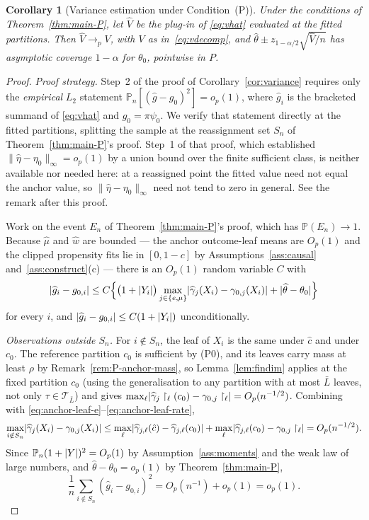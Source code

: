\documentclass[11pt]{article}
\theoremstyle{plain}
\newtheorem{corollary}[theorem]{Corollary}
\theoremstyle{definition}
\theoremstyle{remark}
\newcommand{\PP}{\mathbb{P}}
\newcommand{\Pn}{\mathbb{P}_n}
\newcommand{\cT}{\mathcal{T}}
\newcommand{\mhat}{\widehat{\mu}}
\newcommand{\what}{\widehat{w}}
\newcommand{\thetahat}{\widehat{\theta}}
\newcommand{\Vhat}{\widehat{V}}
\newcommand{\Linf}[1]{\lVert #1 \rVert_{\infty}}
\DeclarePairedDelimiter{\abs}{\lvert}{\rvert}
\begin{document}
\begin{corollary}[Variance estimation under Condition~(P)]
\label{cor:variance-P}
Under the conditions of Theorem~\ref{thm:main-P}, let $\Vhat$ be the plug-in
of \eqref{eq:vhat} evaluated at the fitted partitions. Then $\Vhat\to_pV$,
with $V$ as in~\eqref{eq:vdecomp}, and
$\thetahat\pm z_{1-\alpha/2}\sqrt{\Vhat/n}$ has asymptotic coverage
$1-\alpha$ for $\theta_0$, pointwise in $P$.
\end{corollary}

\begin{proof}
\emph{Proof strategy.} Step~2 of the proof of Corollary~\ref{cor:variance}
requires only the \emph{empirical} $L_2$ statement
$\Pn[(\widehat g-g_0)^2]=o_p(1)$, where $\widehat g_i$ is the bracketed
summand of \eqref{eq:vhat} and $g_0=\pi\psi_0$. We verify that statement
directly at the fitted partitions, splitting the sample at the reassignment
set $S_n$ of Theorem~\ref{thm:main-P}'s proof. Step~1 of that proof, which
established $\Linf{\widehat\eta-\eta_0}=o_p(1)$ by a union bound over the
finite sufficient class, is neither available nor needed here: at a
reassigned point the fitted value need not equal the anchor value, so
$\Linf{\widehat\eta-\eta_0}$ need not tend to zero in general. See the remark
after this proof.

Work on the event $E_n$ of Theorem~\ref{thm:main-P}'s proof, which has
$\PP(E_n)\to1$. Because $\mhat$ and $\what$ are bounded --- the anchor
outcome-leaf means are $O_p(1)$ and the clipped propensity fits lie in
$[0,1-c]$ by Assumptions~\ref{ass:causal} and~\ref{ass:construct}(c) --- there
is an $O_p(1)$ random variable $C$ with
\[
  \abs{\widehat g_i-g_{0,i}}
  \le
  C\Bigl\{
    \bigl(1+\abs{Y_i}\bigr)
    \max_{j\in\{e,\mu\}}
      \abs{\widehat\gamma_j(X_i)-\gamma_{0,j}(X_i)}
    +\abs{\thetahat-\theta_0}
  \Bigr\}
\]
for every $i$, and $\abs{\widehat g_i-g_{0,i}}\le C(1+\abs{Y_i})$
unconditionally.

\emph{Observations outside $S_n$.} For $i\notin S_n$, the leaf of $X_i$ is
the same under $\hat c$ and under $c_0$. The reference partition $c_0$ is
sufficient by (P0), and its leaves carry mass at least $\rho$ by
Remark~\ref{rem:P-anchor-mass}, so Lemma~\ref{lem:findim} applies at the
fixed partition $c_0$ (using the generalisation to any partition with at
most $\bar L$ leaves, not only $\tau\in\cT_{\bar L}$) and gives
$\max_\ell\abs{\widehat\gamma_j\restriction_\ell(c_0)
 -\gamma_{0,j}\restriction_\ell}=O_p(n^{-1/2})$. Combining with
\eqref{eq:anchor-leaf-e}--\eqref{eq:anchor-leaf-rate},
\[
  \max_{i\notin S_n}
  \abs{\widehat\gamma_j(X_i)-\gamma_{0,j}(X_i)}
  \le
  \max_\ell\abs{\widehat\gamma_{j,\ell}(\hat c)-\widehat\gamma_{j,\ell}(c_0)}
  +\max_\ell\abs{\widehat\gamma_{j,\ell}(c_0)
    -\gamma_{0,j}\restriction_\ell}
  =O_p(n^{-1/2}).
\]
Since $\Pn(1+\abs Y)^2=O_p(1)$ by Assumption~\ref{ass:moments} and the weak
law of large numbers, and $\thetahat-\theta_0=o_p(1)$ by
Theorem~\ref{thm:main-P},
\[
  \frac1n\sum_{i\notin S_n}(\widehat g_i-g_{0,i})^2
  =
  O_p(n^{-1})+o_p(1)
  =
  o_p(1).
\]


\end{proof}
\end{document}
